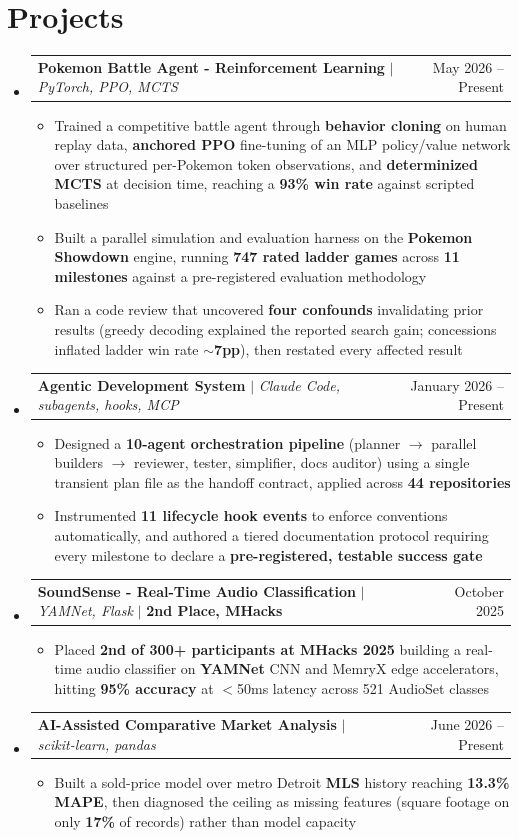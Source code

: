 \documentclass[letterpaper,11pt]{article}
\makeatletter
\newcommand{\resumeItem}[1]{
  \item\small{
    {#1 \vspace{-2pt}}
  }
}
\newcommand{\resumeProjectHeading}[2]{
    \item
    \begin{tabular*}{0.97\textwidth}{l@{\extracolsep{\fill}}r}
      \small#1 & #2 \\
    \end{tabular*}\vspace{-7pt}
}
\newcommand{\resumeSubHeadingListStart}{\begin{itemize}[leftmargin=0.15in, label={}]}
\newcommand{\resumeSubHeadingListEnd}{\end{itemize}}
\newcommand{\resumeItemListStart}{\begin{itemize}}
\newcommand{\resumeItemListEnd}{\end{itemize}\vspace{-5pt}}
\makeatother
\begin{document}
\section{Projects}
    \resumeSubHeadingListStart
      \resumeProjectHeading
          {\textbf{Pokemon Battle Agent - Reinforcement Learning} $|$ \emph{PyTorch, PPO, MCTS}}{May 2026 -- Present}
          \resumeItemListStart
            \resumeItem{Trained a competitive battle agent through \textbf{behavior cloning} on human replay data, \textbf{anchored PPO} fine-tuning of an MLP policy/value network over structured per-Pokemon token observations, and \textbf{determinized MCTS} at decision time, reaching a \textbf{93\% win rate} against scripted baselines}
            \resumeItem{Built a parallel simulation and evaluation harness on the \textbf{Pokemon Showdown} engine, running \textbf{747 rated ladder games} across \textbf{11 milestones} against a pre-registered evaluation methodology}
            \resumeItem{Ran a code review that uncovered \textbf{four confounds} invalidating prior results (greedy decoding explained the reported search gain; concessions inflated ladder win rate $\sim$\textbf{7pp}), then restated every affected result}
          \resumeItemListEnd
      \resumeProjectHeading
          {\textbf{Agentic Development System} $|$ \emph{Claude Code, subagents, hooks, MCP}}{January 2026 -- Present}
          \resumeItemListStart
            \resumeItem{Designed a \textbf{10-agent orchestration pipeline} (planner $\rightarrow$ parallel builders $\rightarrow$ reviewer, tester, simplifier, docs auditor) using a single transient plan file as the handoff contract, applied across \textbf{44 repositories}}
            \resumeItem{Instrumented \textbf{11 lifecycle hook events} to enforce conventions automatically, and authored a tiered documentation protocol requiring every milestone to declare a \textbf{pre-registered, testable success gate}}
          \resumeItemListEnd
      \resumeProjectHeading
          {\textbf{SoundSense - Real-Time Audio Classification} $|$ \emph{YAMNet, Flask} $|$ \textbf{2nd Place, MHacks}}{October 2025}
          \resumeItemListStart
            \resumeItem{Placed \textbf{2nd of 300+ participants at MHacks 2025} building a real-time audio classifier on \textbf{YAMNet} CNN and MemryX edge accelerators, hitting \textbf{95\% accuracy} at $<$50ms latency across 521 AudioSet classes}
          \resumeItemListEnd
      \resumeProjectHeading
          {\textbf{AI-Assisted Comparative Market Analysis} $|$ \emph{scikit-learn, pandas}}{June 2026 -- Present}
          \resumeItemListStart
            \resumeItem{Built a sold-price model over metro Detroit \textbf{MLS} history reaching \textbf{13.3\% MAPE}, then diagnosed the ceiling as missing features (square footage on only \textbf{17\%} of records) rather than model capacity}
          \resumeItemListEnd
    \resumeSubHeadingListEnd
\end{document}
